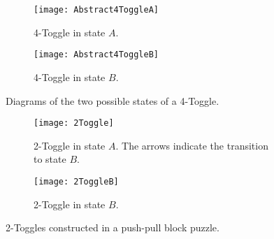 \begin{figure}[!ht]
\centering
\begin{subfigure}[t]{0.45\textwidth}
  \centering
    \texttt{[image: Abstract4ToggleA]}
    \caption{4-Toggle in state $A$. }%
    \label{fig:Abstract4ToggleA}
\end{subfigure}
\begin{subfigure}[t]{0.45\textwidth}
  \centering
    \texttt{[image: Abstract4ToggleB]}
    \caption{4-Toggle in state $B$. } %
    \label{fig:Abstract4ToggleB}
\end{subfigure}
\caption{Diagrams of the two possible states of a 4-Toggle.}
\label{fig:4-toggle}
\end{figure}

\begin{figure}[!ht]
\centering
\begin{subfigure}[t]{0.45\textwidth}
  \centering
    \texttt{[image: 2Toggle]}
    \caption{2-Toggle in state $A$. The arrows indicate the transition to state $B$.}
    \label{fig:2toggleA}
\end{subfigure}
\begin{subfigure}[t]{0.45\textwidth}
  \centering
    \texttt{[image: 2ToggleB]}
    \caption{2-Toggle in state $B$.}
    \label{fig:2toggleB}
\end{subfigure}
    \caption{2-Toggles constructed in a push-pull block puzzle.}
\end{figure}


